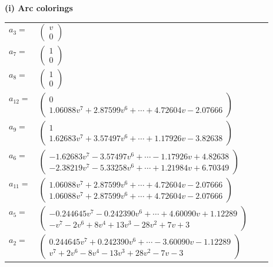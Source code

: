 \documentclass[1p]{elsarticle_modified}
\theoremstyle{definition}
\begin{document}
\flushleft \textbf{(i) Arc colorings}\\
\begin{tabular}{m{7pt} m{180pt} m{7pt} m{180pt} }
\flushright $a_{3}=$&$\begin{pmatrix}v\\0\end{pmatrix}$ \\
\flushright $a_{7}=$&$\begin{pmatrix}1\\0\end{pmatrix}$ \\
\flushright $a_{8}=$&$\begin{pmatrix}1\\0\end{pmatrix}$ \\
\flushright $a_{12}=$&$\begin{pmatrix}0\\1.06088 v^{7}+2.87599 v^{6}+\cdots+4.72604 v-2.07666\end{pmatrix}$ \\
\flushright $a_{9}=$&$\begin{pmatrix}1\\1.62683 v^{7}+3.57497 v^{6}+\cdots+1.17926 v-3.82638\end{pmatrix}$ \\
\flushright $a_{6}=$&$\begin{pmatrix}-1.62683 v^{7}-3.57497 v^{6}+\cdots-1.17926 v+4.82638\\-2.38219 v^{7}-5.33258 v^{6}+\cdots+1.21984 v+6.70349\end{pmatrix}$ \\
\flushright $a_{11}=$&$\begin{pmatrix}1.06088 v^{7}+2.87599 v^{6}+\cdots+4.72604 v-2.07666\\1.06088 v^{7}+2.87599 v^{6}+\cdots+4.72604 v-2.07666\end{pmatrix}$ \\
\flushright $a_{5}=$&$\begin{pmatrix}-0.244645 v^{7}-0.242390 v^{6}+\cdots+4.60090 v+1.12289\\- v^7-2 v^6+8 v^4+13 v^3-28 v^2+7 v+3\end{pmatrix}$ \\
\flushright $a_{2}=$&$\begin{pmatrix}0.244645 v^{7}+0.242390 v^{6}+\cdots-3.60090 v-1.12289\\v^7+2 v^6-8 v^4-13 v^3+28 v^2-7 v-3\end{pmatrix}$ \\

\end{tabular}
\end{document}
